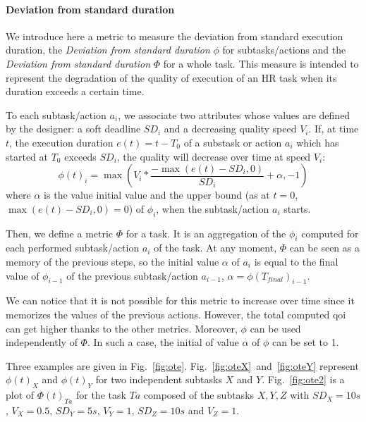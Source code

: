 \documentclass[a4paper,11pt,twoside]{StyleThese}
\begin{document}
\paragraph{Deviation from standard duration}\label{subsubsec:ote}
We introduce here a metric to measure the deviation from standard execution duration, the \textit{Deviation from standard duration} $\phi$ for subtasks/actions and the \textit{Deviation from standard duration} $\Phi$ for a whole task. This measure is intended to represent the degradation of the quality of execution of an HR task when its duration exceeds a certain time. 

To each subtask/action $a_i$, we associate two attributes whose values are defined by the designer: a soft deadline $SD_i$ and a decreasing quality  speed $V_i$. 
If, at time $t$, the execution duration  $e(t) = t - T_0$ of a substask or action $a_i$ which has started at $T_0$ exceeds $SD_i$, the quality will decrease over time at speed $V_i$: 
\begin{equation}\label{eq:ote}
\phi(t)_i=\max\left( V_i*\frac{-\max(e(t)-SD_i,0)}{SD_i}+\alpha,-1\right)
\end{equation}
where $\alpha$ is the value initial value and the upper bound (as at $t=0$, $\max(e(t)-SD_i,0)=0$) of $\phi_i$, when the subtask/action $a_i$ starts.

Then, we define a metric $\Phi$ for a task. It is an aggregation of the $\phi_i$ computed for each performed subtask/action $a_i$ of the task. At any moment, $\Phi$ can be seen as a memory of the previous steps, so the initial value $\alpha$ of $a_i$ is equal to the final value of $\phi_{i-1}$ of the previous subtask/action $a_{i-1}$, $\alpha=\phi(T_{final})_{i-1}$.


We can notice that it is not possible for this metric to increase over time since it memorizes the values of the previous actions. However, the total computed \acrshort{qoi} can get higher thanks to the other metrics. Moreover, $\phi$ can be used independently of $\Phi$. In such a case, the initial of value $\alpha$ of $\phi$ can be set to 1. 

Three examples are given in Fig.~\ref{fig:ote}. Fig.~\ref{fig:oteX}~and~\ref{fig:oteY} represent $\phi(t)_{X}$ and $\phi(t)_{Y}$ for two independent subtasks $X$ and $Y$. Fig.~\ref{fig:ote2} is a plot of $\Phi(t)_{Ta}$ for the task $Ta$ composed of the subtasks $X, Y, Z$ with $SD_X=10 s$, $V_X=0.5$, $SD_Y=5 s$, $V_Y=1$, $SD_Z=10 s$ and $V_Z=1$.
\end{document}
